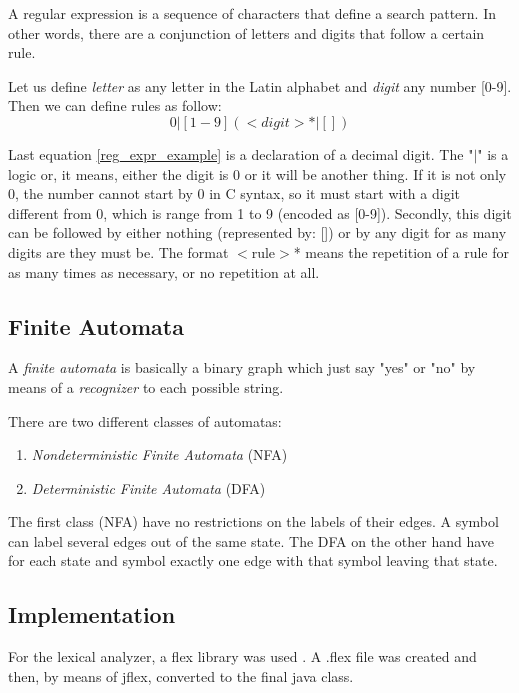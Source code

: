 \documentclass[conference]{IEEEtran}
\theoremstyle{definition}
\begin{document}
A regular expression is a sequence of characters that define a search pattern. In other words, there are a conjunction of letters and digits that follow a certain rule.

Let us define \textit{letter} as any letter in the Latin alphabet and \textit{digit} any number [0-9]. Then we can define rules as follow:
\begin{equation}
0 | [1-9] (<digit>* | [])\label{reg_expr_example}
\end{equation}

Last equation \ref{reg_expr_example} is a declaration of a decimal digit. The "$|$" is a logic or, it means, either the digit is 0 or it will be another thing. If it is not only 0, the number cannot start by 0 in C syntax, so it must start with a digit different from 0, which is range from 1 to 9 (encoded as [0-9]). Secondly, this digit can be followed by either nothing (represented by: []) or by any digit for as many digits are they must be. The format $<$rule$>$* means the repetition of a rule for as many times as necessary, or no repetition at all.

\subsection{Finite Automata}
A \textit{finite automata} is basically a binary graph which just say "yes" or "no" by means of a \textit{recognizer} to each possible string.

There are two different classes of automatas:
\begin{enumerate}
	\item \textit{Nondeterministic Finite Automata} (NFA)
	\item \textit{Deterministic Finite Automata} (DFA)
\end{enumerate}
The first class (NFA) have no restrictions on the labels of their edges. A symbol can label several edges out of the same state. The DFA on the other hand have for each state and symbol exactly one edge with that symbol leaving that state.

\subsection{Implementation}

For the lexical analyzer, a flex library was used \cite{JFLEX}. A .flex file was created and then, by means of jflex, converted to the final java class.
\end{document}
